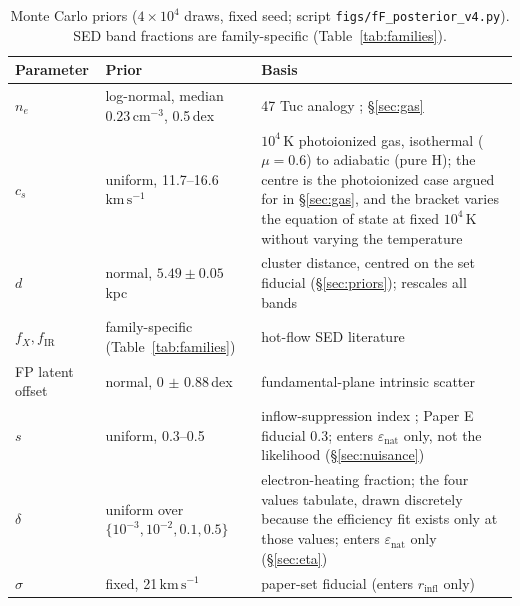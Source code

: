 \documentclass[11pt]{article}
\begin{document}
\begin{table}[tbp]
\centering
\small
\caption{Monte Carlo priors ($4\times10^{4}$ draws, fixed seed; script \texttt{figs/fF\_posterior\_v4.py}). SED band fractions are family-specific (Table~\ref{tab:families}).}
\label{tab:priors}
\begin{tabular}{llp{5.6cm}}
\toprule
Parameter & Prior & Basis \\
\midrule
$n_{e}$ & log-normal, median $0.23\,\mathrm{cm^{-3}}$, 0.5\,dex & 47 Tuc analogy \citep{Freire2001,Abbate2018}; \S\ref{sec:gas} \\
$c_{s}$ & uniform, 11.7--16.6\,$\mathrm{km\,s^{-1}}$ & $10^{4}$\,K photoionized gas, isothermal ($\mu{=}0.6$) to adiabatic (pure H); the centre is the photoionized case argued for in \S\ref{sec:gas}, and the bracket varies the equation of state at fixed $10^{4}$\,K without varying the temperature \\
$d$ & normal, $5.49 \pm 0.05$\,kpc & cluster distance, centred on the set fiducial (\S\ref{sec:priors}); rescales all bands \\
$f_{X}, f_{\mathrm{IR}}$ & family-specific (Table~\ref{tab:families}) & hot-flow SED literature \\
FP latent offset & normal, 0 $\pm$ 0.88\,dex & fundamental-plane intrinsic scatter \citep{Merloni2003} \\
$s$ & uniform, 0.3--0.5 & inflow-suppression index \citep{YuanNarayan2014}; Paper E fiducial 0.3; enters $\varepsilon_{\mathrm{nat}}$ only, not the likelihood (\S\ref{sec:nuisance}) \\
$\delta$ & uniform over $\{10^{-3}, 10^{-2}, 0.1, 0.5\}$ & electron-heating fraction; the four values \citet{XieYuan2012} tabulate, drawn discretely because the efficiency fit exists only at those values; enters $\varepsilon_{\mathrm{nat}}$ only (\S\ref{sec:eta}) \\
$\sigma$ & fixed, 21\,$\mathrm{km\,s^{-1}}$ & paper-set fiducial (enters $r_{\mathrm{infl}}$ only) \\
\bottomrule
\end{tabular}
\end{table}
\end{document}
